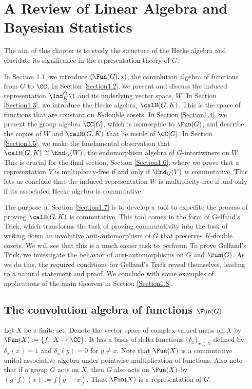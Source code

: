 \section{A Review of Linear Algebra and Bayesian Statistics}\label{Chapter1}
The aim of this chapter is to study the structure of the Hecke algebra and elucidate its significance in the representation theory of $G$.

In Section \ref{Section1.1}, we introduce $(\Fun(G),\star)$, the convolution algebra of functions from $G$ to $\CC$.
In Section \ref{Section1.2}, we present and discuss the induced representation $\Ind_K^G\1$ and its underlying vector space, $W$.
In Section \ref{Section1.3}, we introduce the Hecke algebra, $\calH(G,K)$.
This is the space of functions that are constant on $K$-double cosets.
In Section \ref{Section1.4}, we present the group algebra $\CC[G]$, which is isomorphic to $\Fun(G)$, and describe the copies of $W$ and $\calH(G,K)$ that lie inside of $\CC[G]$.
In Section \ref{Section1.5}, we make the fundamental observation that $\calH(G,K)\cong\End_G(W)$, the endomorphism algebra of $G$-intertwiners on $W$.
This is crucial for the final section, Section \ref{Section1.6}, where we prove that a representation $V$ is multiplicity-free if and only if $\End_G(V)$ is commutative.
This lets us conclude that the induced representation $W$ is multiplicity-free if and only if its associated Hecke algebra is commutative.

The purpose of Section \ref{Section1.7} is to develop a tool to expedite the process of proving $\calH(G,K)$ is commutative.
This tool comes in the form of Gelfand's Trick, which transforms the task of proving commutativity into the task of writing down an involutive anti-automorphism of $G$ that preserves $K$-double cosets.
We will see that this is a much easier task to perform.
To prove Gelfand's Trick, we investigate the behavior of anti-automorphisms on $G$ and $\Fun(G)$.
As we do this, the required conditions for Gelfand's Trick reveal themselves, leading to a natural statement and proof.
We conclude with some examples of applications of the main theorem in Section \ref{Section1.8}.


\subsection{The convolution algebra of functions $\Fun(G)$}\label{Section1.1}
Let $X$ be a finite set.
Denote the vector space of complex-valued maps on $X$ by $\Fun(X) := \{f\colon X\to \CC\}$.
It has a basis of delta functions $\{\delta_x\}_{x\in X}$ defined by $\delta_x(x)=1$ and $\delta_x(y)=0$ for $y\neq x$.
Note that $\Fun(X)$ is a commutative unital associative algebra under pointwise multiplication of functions.
Also note that if a group $G$ acts on $X$, then $G$ also acts on $\Fun(X)$ by $(g\cdot f)(x) := f(g^{-1}\cdot x)$.
Thus, $\Fun(X)$ is a representation of $G$.

